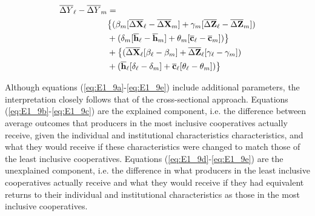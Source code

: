 \documentclass[11pt]{article}
\begin{document}
\begin{subequations}
    \begin{align}
        \overline{\Delta Y}_{\ell} - \overline{\Delta Y}_{m} &= \label{eq:E1_9a} \\ 
        &\big{\{}(\beta_{m}[\overline{\Delta \mathbf{X}}_{\ell} - \overline{\Delta \mathbf{X}}_{m}] + \gamma_{m}[\overline{\Delta \mathbf{Z}}_{\ell} - \overline{\Delta \mathbf{Z}}_{m}]) \label{eq:E1_9b} \\
        &+ (\delta_{m}[\overline{\mathbf{h}}_{\ell} - \overline{\mathbf{h}}_{m}] + \theta_{m}[\overline{\mathbf{c}}_{\ell} - \overline{\mathbf{c}}_{m}])\big{\}} \label{eq:E1_9c} \\
        &+ \big{\{}(\overline{\Delta \mathbf{X}}_{\ell}[\beta_{\ell} - \beta_{m}] + \overline{\Delta \mathbf{Z}}_{\ell}[\gamma_{\ell} - \gamma_{m}]) \label{eq:E1_9d} \\
        &+ (\overline{\mathbf{h}}_{\ell}[\delta_{\ell} - \delta_{m}] + \overline{\mathbf{c}}_{\ell}[\theta_{\ell} - \theta_{m}])\big{\}} \label{eq:E1_9e}
    \end{align}
\end{subequations}  

Although equations (\ref{eq:E1_9a}-\ref{eq:E1_9e}) include additional parameters, the interpretation closely follows that of the cross-sectional approach. Equations (\ref{eq:E1_9b}-\ref{eq:E1_9c}) are the explained component, i.e. the difference between average outcomes that producers in the most inclusive cooperatives actually receive, given the individual and institutional characteristics characteristics, and what they would receive if these characteristics were changed to match those of the least inclusive cooperatives. Equations (\ref{eq:E1_9d}-\ref{eq:E1_9e}) are the unexplained component, i.e. the difference in what producers in the least inclusive cooperatives actually receive and what they would receive if they had equivalent returns to their individual and institutional characteristics as those in the most inclusive cooperatives.

\end{document}
